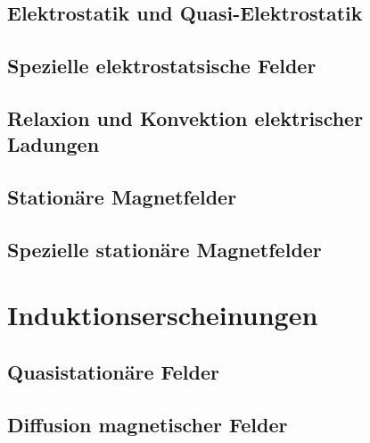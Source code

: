 \documentclass[12pt]{article} %
\numberwithin{equation}{subsection}
\begin{document}
	\subsection{Elektrostatik und Quasi-Elektrostatik}
	
	 
	
	\subsection{Spezielle elektrostatsische Felder}
	
	 
	
	\subsection{Relaxion und Konvektion elektrischer Ladungen}
	
	 
	
	\subsection{Stationäre Magnetfelder}
	
	
	
	
	\subsection{Spezielle stationäre Magnetfelder}
	
	 
	
	\section{Induktionserscheinungen}
	\subsection{Quasistationäre Felder}
	
	 
	
	\subsection{Diffusion magnetischer Felder}
	
	 
	
\end{document}
